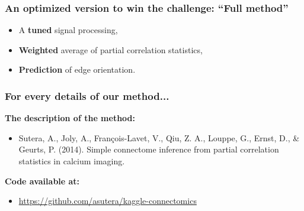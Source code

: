 \documentclass[final]{beamer}
\begin{document}
\begin{frame}
\frametitle{An optimized version to win the challenge: ``Full method''}

\begin{itemize}
\item A \textbf{tuned} signal processing,
\item \textbf{Weighted} average of partial correlation statistics,
\item \textbf{Prediction} of edge orientation.
\end{itemize}

\end{frame}


\begin{frame}
\frametitle{For every details of our method...}

\textbf{The description of the method:}
\begin{itemize}
\item[] Sutera, A., Joly, A., François-Lavet, V., Qiu, Z. A., Louppe, G., Ernst, D., \& Geurts, P. (2014). Simple connectome inference from partial correlation statistics in calcium imaging.\\[7ex]
\end{itemize} 

\textbf{Code available at:}
\begin{itemize}
\item[] \url{https://github.com/asutera/kaggle-connectomics}
\end{itemize}

\end{frame}
\end{document}
